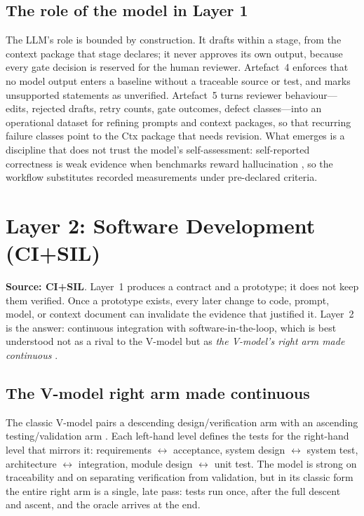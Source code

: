 \documentclass[11pt,a4paper]{article}
\begin{document}
\subsection{The role of the model in Layer 1}
\label{sec:llmrole}

The LLM's role is bounded by construction. It drafts within a stage, from the context package
that stage declares; it never approves its own output, because every gate decision is reserved
for the human reviewer. Artefact~4 enforces that no model output enters a baseline without a
traceable source or test, and marks unsupported statements as unverified. Artefact~5 turns
reviewer behaviour---edits, rejected drafts, retry counts, gate outcomes, defect classes---into
an operational dataset for refining prompts and context packages, so that recurring failure
classes point to the Ctx package that needs revision. What emerges is a discipline that does not
trust the model's self-assessment: self-reported correctness is weak evidence when benchmarks
reward hallucination \cite{kalai2026}, so the workflow substitutes recorded measurements under
pre-declared criteria.

\section{Layer 2: Software Development (CI+SIL)}
\label{sec:layer2}

\textbf{Source: CI+SIL}. Layer~1 produces a contract and a prototype; it does not keep them
verified. Once a prototype exists, every later change to code, prompt, model, or context document
can invalidate the evidence that justified it. Layer~2 is the answer: continuous integration with
software-in-the-loop, which is best understood not as a rival to the V-model but as \emph{the
V-model's right arm made continuous} \cite{sheridan2026a}.

\subsection{The V-model right arm made continuous}
\label{sec:continuous}

The classic V-model pairs a descending design/verification arm with an ascending
testing/validation arm \cite{qmsdoc2026,sheridan2026b}. Each left-hand level defines the tests
for the right-hand level that mirrors it: requirements $\leftrightarrow$ acceptance, system
design $\leftrightarrow$ system test, architecture $\leftrightarrow$ integration, module design
$\leftrightarrow$ unit test. The model is strong on traceability and on separating verification
from validation, but in its classic form the entire right arm is a single, late pass: tests run
once, after the full descent and ascent, and the oracle arrives at the end.
\end{document}
